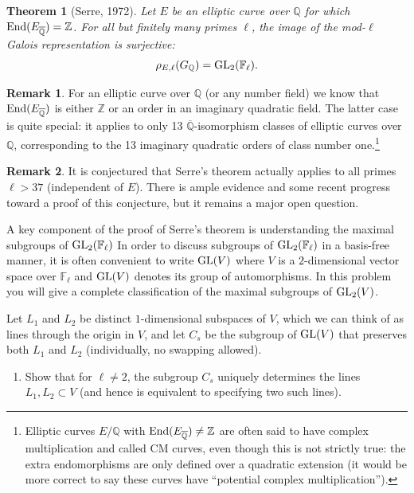 \documentclass[11pt]{article}
\newcommand{\F}{\mathbb{F}}
\newcommand{\Q}{\mathbb{Q}}
\newcommand{\Z}{\mathbb{Z}}
\newcommand{\GL}{{\rm GL}}
\newcommand{\End}{{\rm End}}
\newtheorem*{theorem}{Theorem}
\theoremstyle{definition}
\newtheorem*{remark}{Remark}
\begin{document}
\begin{theorem}[Serre, 1972]
Let $E$ be an elliptic curve over $\Q$ for which $\End(E_{\overline{\Q}})=\Z$.  For all but finitely many primes $\ell$, the image of the mod-$\ell$ Galois representation is surjective:
\[\rho_{E, \ell}(G_\Q) = \GL_2(\F_\ell). \]
\end{theorem}

\begin{remark}
For an elliptic curve over $\Q$ (or any number field) we know that $\End(E_{\overline{\Q}})$ is either $\Z$ or an order in an imaginary quadratic field.
The latter case is quite special: it applies to only 13 $\overline{\Q}$-isomorphism classes of elliptic curves over $\Q$, corresponding to the 13 imaginary quadratic orders of class number one.\footnote{Elliptic curves $E/\Q$ with $\End(E_{\overline{\Q}})\ne \Z$ are often said to have complex multiplication and called CM curves, even though this is not strictly true: the extra endomorphisms are only defined over a quadratic extension (it would be more correct to say these curves have ``potential complex multiplication'').}
\end{remark}
\begin{remark}
It is conjectured that Serre's theorem actually applies to all primes $\ell > 37$ (independent of $E$).  There is ample evidence and some recent progress toward a proof of this conjecture, but it remains a major open question.
\end{remark}

A key component of the proof of Serre's theorem is understanding the maximal subgroups of $\GL_2(\F_\ell)$
In order to discuss subgroups of $\GL_2(\F_\ell)$ in a basis-free manner, it is often convenient to write $\GL(V)$ where $V$ is a $2$-dimensional vector space over $\F_\ell$ and $\GL(V)$ denotes its group of automorphisms.
In this problem you will give a complete classification of the maximal subgroups of $\GL_2(V)$.


Let $L_1$ and $L_2$ be distinct $1$-dimensional subspaces of $V$, which we can think of as lines through the origin in $V$, and let $C_s$ be the subgroup of $\GL(V)$ that preserves both $L_1$ and $L_2$ (individually, no swapping allowed).

\begin{enumerate}[{\bf(a)}]

\item Show that for $\ell \neq 2$, the subgroup $C_s$ uniquely determines the lines $L_1, L_2 \subset	 V$ (and hence is equivalent to specifying two such lines).

\end{enumerate}
\end{document}
